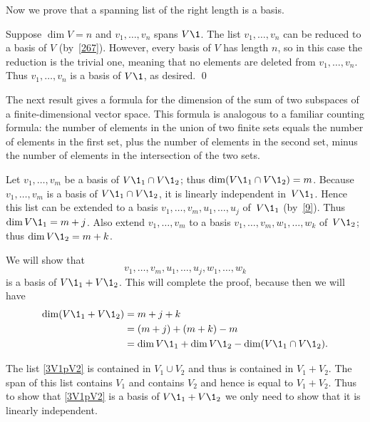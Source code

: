 Now we prove that a spanning list of the right length is a basis.


\proof
Suppose $\dim V = n$ and $v_1, \dots, v_n$ spans $V\1$.  The list
$v_1, \dots, v_n$ can be reduced to a basis of $V$ (by~\ref{267}).  However,
every basis of $V$ has length $n$, so in this case the reduction is the
trivial one, meaning that no elements are deleted from $v_1, \dots, v_n$. Thus $v_1, \dots, v_n$ is a basis of $V\1$, as desired.
\qed

The next result gives a formula for the dimension of the sum of two
subspaces of  a finite-dimensional vector space. This formula is
analogous to a familiar counting formula: the number of elements in the union
of two finite sets equals the number of elements in the first set, plus the
number of elements in the second set, minus the number of elements in the
intersection of the two sets.


\proof
Let $v_1, \dots, v_m$ be a basis of $V\1_1 \cap V\1_2$;
thus $\dim(V\1_1 \cap V\1_2) = m$.  Because $v_1, \dots, v_m$ is a basis of
$V\1_1 \cap V\1_2$, it is linearly independent in~$V\1_1$. Hence this list can be extended
to a basis $v_1, \dots, v_m, u_1, \dots, u_j$ of~$V\1_1$ (by~\ref{9}).  Thus
$\dim V\1_1 = m + j$.  Also extend $v_1, \dots, v_m$ to a basis
$v_1, \dots, v_m, w_1, \dots, w_k$ of~$V\1_2$; thus $\dim V\1_2 = m + k$.

We will show that
\begin{equation} \label{3V1pV2}
v_1, \dots, v_m, u_1, \dots, u_j, w_1, \dots, w_k
\end{equation}%
is a basis
of $V\1_1 + V\1_2$.  This will complete the proof, because then we will have
\begin{align*}
\dim (V\1_1 + V\1_2) &= m + j + k \\
&= (m + j) + (m + k) - m \\
&= \dim V\1_1 + \dim V\1_2 - \dim(V\1_1 \cap V\1_2).
\end{align*}

The list \ref{3V1pV2} is contained in $V_1 \cup V_2$ and thus is contained in $V_1 + V_2$. The span of this list contains $V_1$ and contains $V_2$ and hence is equal to
$V_1 + V_2$. Thus to show that \ref{3V1pV2} is a basis of $V\1_1 + V\1_2$ we only need to show that
it is linearly independent.

